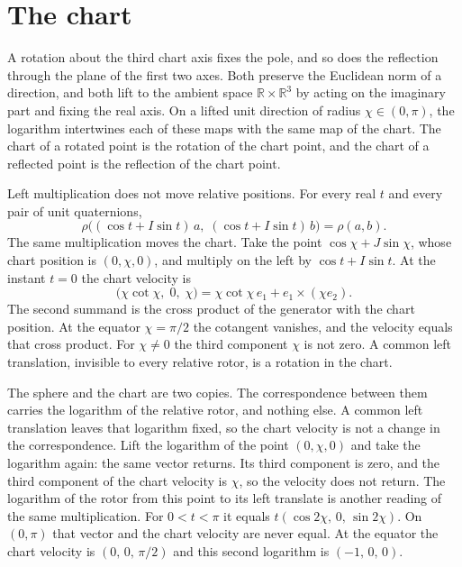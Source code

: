 \documentclass[a4paper]{article}
\begin{document}
\section{The chart}
\label{sec:chart}

A rotation about the third chart axis fixes the pole, and so does the reflection through the plane of the first two axes. Both preserve the Euclidean norm of a direction, and both lift to the ambient space \(\mathbb{R}\times\mathbb{R}^3\) by acting on the imaginary part and fixing the real axis. On a lifted unit direction of radius \(\chi\in(0,\pi)\), the logarithm intertwines each of these maps with the same map of the chart. The chart of a rotated point is the rotation of the chart point, and the chart of a reflected point is the reflection of the chart point.

Left multiplication does not move relative positions. For every real \(t\) and every pair of unit quaternions,
\begin{equation}
\label{eq:left-relative}
\rho\bigl((\cos t+I\sin t)\,a,\;(\cos t+I\sin t)\,b\bigr)=\rho(a,b).
\end{equation}
The same multiplication moves the chart. Take the point \(\cos\chi+J\sin\chi\), whose chart position is \((0,\chi,0)\), and multiply on the left by \(\cos t+I\sin t\). At the instant \(t=0\) the chart velocity is
\begin{equation}
\label{eq:left-velocity}
\bigl(\chi\cot\chi,\;0,\;\chi\bigr)
=
\chi\cot\chi\,e_1
+
e_1\times(\chi e_2).
\end{equation}
The second summand is the cross product of the generator with the chart position. At the equator \(\chi=\pi/2\) the cotangent vanishes, and the velocity equals that cross product. For \(\chi\neq 0\) the third component \(\chi\) is not zero. A common left translation, invisible to every relative rotor, is a rotation in the chart.

The sphere and the chart are two copies. The correspondence between them carries the logarithm of the relative rotor, and nothing else. A common left translation leaves that logarithm fixed, so the chart velocity is not a change in the correspondence. Lift the logarithm of the point \((0,\chi,0)\) and take the logarithm again: the same vector returns. Its third component is zero, and the third component of the chart velocity is \(\chi\), so the velocity does not return. The logarithm of the rotor from this point to its left translate is another reading of the same multiplication. For \(0<t<\pi\) it equals \(t(\cos 2\chi,\,0,\,\sin 2\chi)\). On \((0,\pi)\) that vector and the chart velocity are never equal. At the equator the chart velocity is \((0,\,0,\,\pi/2)\) and this second logarithm is \((-1,\,0,\,0)\).
\end{document}
